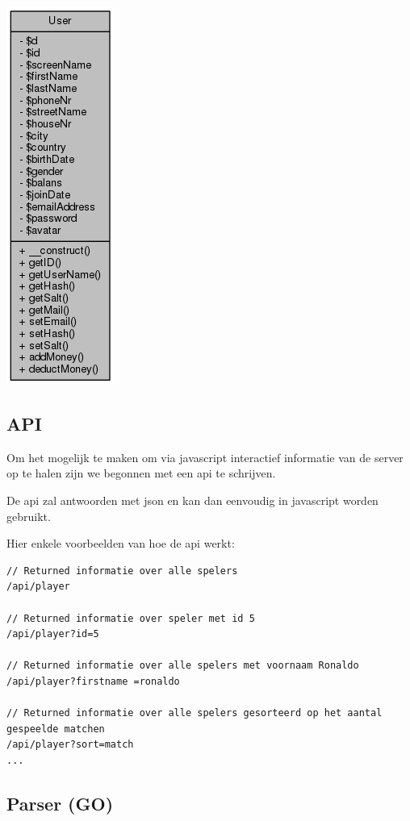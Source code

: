 \documentclass[11pt]{article}
\begin{document}
\includegraphics[scale=0.4]{UML_User.png}

\subsection{API}

Om het mogelijk te maken om via javascript interactief informatie van de server
op te halen zijn we begonnen met een api te schrijven.

De api zal antwoorden met json en kan dan eenvoudig in javascript worden gebruikt.

Hier enkele voorbeelden van hoe de api werkt:
\begin{framed}
\begin{lstlisting}
// Returned informatie over alle spelers
/api/player	

// Returned informatie over speler met id 5
/api/player?id=5 

// Returned informatie over alle spelers met voornaam Ronaldo
/api/player?firstname =ronaldo 

// Returned informatie over alle spelers gesorteerd op het aantal gespeelde matchen
/api/player?sort=match
... 
\end{lstlisting}
\end{framed}


\subsection{Parser (GO)}
\end{document}
